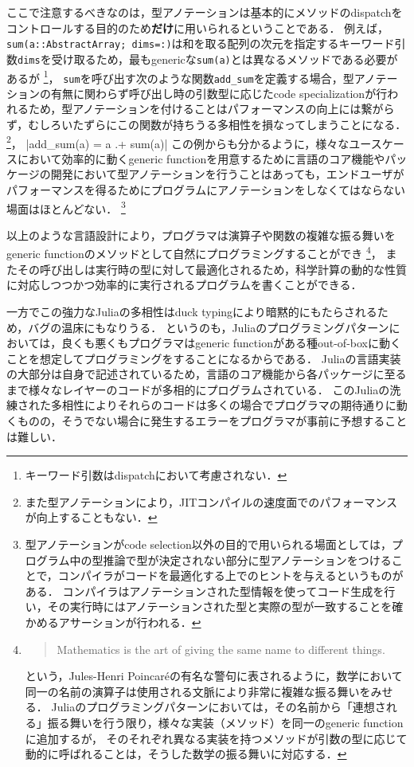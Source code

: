 ここで注意するべきなのは，型アノテーションは基本的にメソッドのdispatchをコントロールする目的のため\textbf{だけ}に用いられるということである．
例えば，\texttt{sum(a::AbstractArray; dims=:)}は和を取る配列の次元を指定するキーワード引数\texttt{dims}を受け取るため，最もgenericな\texttt{sum(a)}とは異なるメソッドである必要があるが
\footnote{
  キーワード引数はdispatchにおいて考慮されない．
}，
\texttt{sum}を呼び出す次のような関数\texttt{add\_sum}を定義する場合，型アノテーションの有無に関わらず呼び出し時の引数型に応じたcode specializationが行われるため，型アノテーションを付けることはパフォーマンスの向上には繋がらず，むしろいたずらにこの関数が持ちうる多相性を損なってしまうことになる．
\footnote{
  また型アノテーションにより，JITコンパイルの速度面でのパフォーマンスが向上することもない．
}，
|add_sum(a) = a .+ sum(a)|
この例からも分かるように，様々なユースケースにおいて効率的に動くgeneric functionを用意するために言語のコア機能やパッケージの開発において型アノテーションを行うことはあっても，エンドユーザがパフォーマンスを得るためにプログラムにアノテーションをしなくてはならない場面はほとんどない．
\footnote{
  型アノテーションがcode selection以外の目的で用いられる場面としては，プログラム中の型推論で型が決定されない部分に型アノテーションをつけることで，コンパイラがコードを最適化する上でのヒントを与えるというものがある．\cite{type-annotation}
  コンパイラはアノテーションされた型情報を使ってコード生成を行い，その実行時にはアノテーションされた型と実際の型が一致することを確かめるアサーションが行われる．
}

以上のような言語設計により，プログラマは演算子や関数の複雑な振る舞いをgeneric functionのメソッドとして自然にプログラミングすることができ
\footnote{
  \begin{quote}
    Mathematics is the art of giving the same name to different things.
  \end{quote}
  という，Jules-Henri Poincaréの有名な警句に表されるように，数学において同一の名前の演算子は使用される文脈により非常に複雑な振る舞いをみせる．
  Juliaのプログラミングパターンにおいては，その名前から「連想される」振る舞いを行う限り，様々な実装（メソッド）を同一のgeneric functionに追加するが，
  そのそれぞれ異なる実装を持つメソッドが引数の型に応じて動的に呼ばれることは，そうした数学の振る舞いに対応する．
}，
またその呼び出しは実行時の型に対して最適化されるため，科学計算の動的な性質に対応しつつかつ効率的に実行されるプログラムを書くことができる．

一方でこの強力なJuliaの多相性はduck typingにより暗黙的にもたらされるため，バグの温床にもなりうる．
というのも，Juliaのプログラミングパターンにおいては，良くも悪くもプログラマはgeneric functionがある種out-of-boxに動くことを想定してプログラミングをすることになるからである．
Juliaの言語実装の大部分は自身で記述されているため，言語のコア機能から各パッケージに至るまで様々なレイヤーのコードが多相的にプログラムされている．
このJuliaの洗練された多相性によりそれらのコードは多くの場合でプログラマの期待通りに動くものの，そうでない場合に発生するエラーをプログラマが事前に予想することは難しい．

